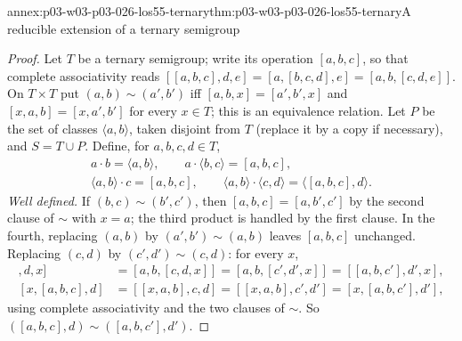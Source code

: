 \begin{annexitem}{annex:p03-w03-p03-026-los55-ternary}{thm:p03-w03-p03-026-los55-ternary}{A reducible extension of a ternary semigroup}
\begin{proof}
Let \(T\) be a ternary semigroup; write its operation \([a,b,c]\), so that
complete associativity reads
\([[a,b,c],d,e]=[a,[b,c,d],e]=[a,b,[c,d,e]]\).  On \(T\times T\) put
\((a,b)\sim(a',b')\) iff \([a,b,x]=[a',b',x]\) and \([x,a,b]=[x,a',b']\) for
every \(x\in T\); this is an equivalence relation.  Let \(P\) be the set of
classes \(\langle a,b\rangle\), taken disjoint from \(T\) (replace it by a
copy if necessary), and \(S=T\cup P\).  Define, for \(a,b,c,d\in T\),
\begin{gather*}
 a\cdot b=\langle a,b\rangle,\qquad
 a\cdot\langle b,c\rangle=[a,b,c],\\
 \langle a,b\rangle\cdot c=[a,b,c],\qquad
 \langle a,b\rangle\cdot\langle c,d\rangle=\langle[a,b,c],d\rangle .
\end{gather*}
\emph{Well defined.}  If \((b,c)\sim(b',c')\), then
\([a,b,c]=[a,b',c']\) by the second clause of \(\sim\) with \(x=a\); the
third product is handled by the first clause.  In the fourth, replacing
\((a,b)\) by \((a',b')\sim(a,b)\) leaves \([a,b,c]\) unchanged.  Replacing
\((c,d)\) by \((c',d')\sim(c,d)\): for every \(x\),
\begin{align*}
 [[a,b,c],d,x]&=[a,b,[c,d,x]]=[a,b,[c',d',x]]=[[a,b,c'],d',x],\\
 [x,[a,b,c],d]&=[[x,a,b],c,d]=[[x,a,b],c',d']=[x,[a,b,c'],d'],
\end{align*}
using complete associativity and the two clauses of \(\sim\).  So
\(([a,b,c],d)\sim([a,b,c'],d')\).


\end{proof}
\end{annexitem}
